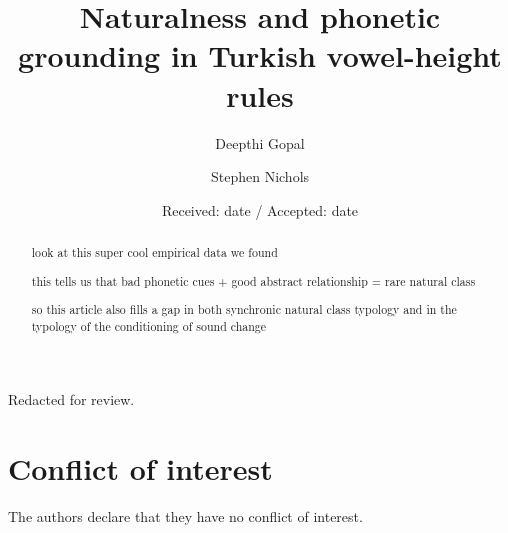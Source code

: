 

\title{Naturalness and phonetic grounding in Turkish vowel-height rules%
}


\author{Deepthi Gopal         \and
        Stephen Nichols %
}



\date{Received: date / Accepted: date}


\maketitle

\begin{abstract}
  look at this super cool empirical data we found

  this tells us that bad phonetic cues + good abstract relationship = rare natural class


  so this article also fills a gap in both synchronic natural class typology and in the typology of the conditioning of sound change
\end{abstract}



\begin{acknowledgements}
Redacted for review.
\end{acknowledgements}

\section*{Conflict of interest}
%
The authors declare that they have no conflict of interest.

